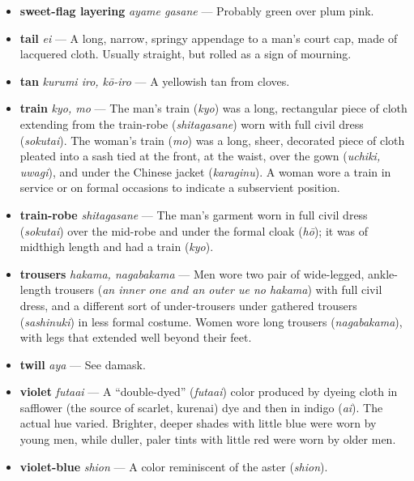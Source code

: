 \documentclass{article}
\begin{document}
\begin{multicols}{3}
\begin{footnotesize}
\begin{itemize}[
			label=,
			leftmargin=0em,
			rightmargin=-1.5em,
			itemindent=-2em,
			nosep,
		]
		\item \textbf{sweet-flag layering} \textit{ayame gasane} --- Probably green over plum pink.

		\item \textbf{tail} \textit{ei} --- A long, narrow, springy appendage to a man's court cap, made of lacquered cloth. Usually straight, but rolled as a sign of mourning.

		\item \textbf{tan} \textit{kurumi iro, kō-iro} --- A yellowish tan from cloves.

		\item \textbf{train} \textit{kyo, mo} --- The man's train (\textit{kyo}) was a long, rectangular piece of cloth extending from the train-robe (\textit{shitagasane}) worn with full civil dress (\textit{sokutai}). The woman's train (\textit{mo}) was a long, sheer, decorated piece of cloth pleated into a sash tied at the front, at the waist, over the gown (\textit{uchiki, uwagi}), and under the Chinese jacket (\textit{karaginu}). A woman wore a train in service or on formal occasions to indicate a subservient position.

		\item \textbf{train-robe} \textit{shitagasane} --- The man's garment worn in full civil dress (\textit{sokutai}) over the mid-robe and under the formal cloak (\textit{hō}); it was of midthigh length and had a train (\textit{kyo}).

		\item \textbf{trousers} \textit{hakama, nagabakama} --- Men wore two pair of wide-legged, ankle-length trousers (\textit{an inner one and an outer ue no hakama}) with full civil dress, and a different sort of under-trousers under gathered trousers (\textit{sashinuki}) in less formal costume. Women wore long trousers (\textit{nagabakama}), with legs that extended well beyond their feet.

		\item \textbf{twill} \textit{aya} --- See damask.

		\item \textbf{violet} \textit{futaai} --- A “double-dyed” (\textit{futaai}) color produced by dyeing cloth in safflower (the source of scarlet, kurenai) dye and then in indigo (\textit{ai}). The actual hue varied. Brighter, deeper shades with little blue were worn by young men, while duller, paler tints with little red were worn by older men.

		\item \textbf{violet-blue} \textit{shion} --- A color reminiscent of the aster (\textit{shion}).


\end{itemize}
\end{footnotesize}
\end{multicols}
\end{document}
